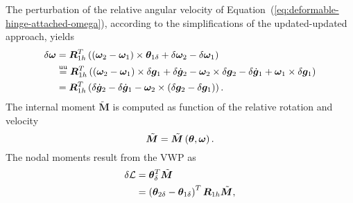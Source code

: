 \documentclass[10pt,fleqn,subeqn]{report}
\newcommand{\T}[1]{\bm{#1}}
\newcommand{\TT}[1]{\bm{#1}}
\newcommand{\equu}{\overset{\text{uu}}{=}}
\begin{document}
\begin{comment}
The relative angular velocity stems from the time derivative
of $\TT{R}_{1h}^T\TT{R}_{2h}$
\begin{equation}
	\T{\omega} = \T{R}_{1h}^T\plbr{\T{\omega}_2 - \T{\omega}_1} ;
	\label{eq:deformable-hinge-attached-omega}
\end{equation}
in fact, the time derivative of the relative orientation yields
\begin{align}
	\T{\omega} \times{}
	&= \frac{\mathrm{d}}{\mathrm{d}t}\plbr{\T{R}_{1h}^T \T{R}_{2h}}\plbr{\T{R}_{1h}^T \T{R}_{2h}}^T \nonumber \\
	&= \plbr{\dot{\T{R}}_{1h}^T \T{R}_{2h} + \T{R}_{1h}^T \dot{\T{R}}_{2h}} \T{R}_{2h}^T \T{R}_{1h} \nonumber \\
	&= \T{R}_{1h}^T \T{\omega}_1 \times{}^T \T{R}_{1h} + \T{R}_{1h}^T \T{\omega}_2 \times \T{R}_{1h} \nonumber \\
	&= \T{R}_{1h}^T \plbr{\T{\omega}_2 - \T{\omega}_1} \times \T{R}_{1h}
\end{align}
\end{comment}
The perturbation of the relative angular velocity
of Equation~(\ref{eq:deformable-hinge-attached-omega}),
according to the simplifications of the updated-updated approach, yields
\begin{align}
	\delta\T{\omega} &= \T{R}_{1h}^T\plbr{
		\plbr{\T{\omega}_2 - \T{\omega}_1} \times \T{\theta}_{1\delta}
		+ \delta\T{\omega}_2
		- \delta\T{\omega}_1
	} \nonumber \\
	&\equu \T{R}_{1h}^T\plbr{
		\plbr{\T{\omega}_2 - \T{\omega}_1} \times \delta\T{g}_1
		+ \delta\dot{\T{g}}_2 - \T{\omega}_2 \times \delta\T{g}_2
		- \delta\dot{\T{g}}_1 + \T{\omega}_1 \times \delta\T{g}_1
	} \nonumber \\
	&= \T{R}_{1h}^T\plbr{
		\delta\dot{\T{g}}_2
		- \delta\dot{\T{g}}_1
		- \T{\omega}_2 \times \plbr{\delta\T{g}_2 - \delta\T{g}_1}
	} .
\end{align}
The internal moment $\tilde{\T{M}}$ is computed as function
of the relative rotation and velocity
\begin{equation}
	\tilde{\T{M}} = \tilde{\T{M}}\plbr{\T{\theta}, \T{\omega}} .
\end{equation}
The nodal moments result from the VWP as
\begin{align}
	\delta\mathcal{L} &= \T{\theta}_{\delta}^T \tilde{\T{M}} \nonumber \\
	&= \plbr{
		\T{\theta}_{2\delta} - \T{\theta}_{1\delta}
	}^T \T{R}_{1h} \tilde{\T{M}} ,
\end{align}
\end{document}

